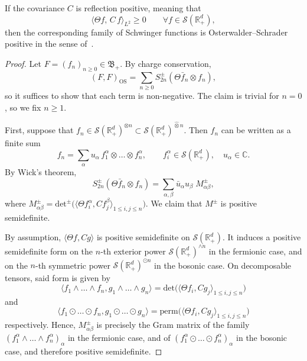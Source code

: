 \documentclass[10pt,a4paper,oneside,reqno]{amsart}
\newcommand{\reals}{\mathbb{R}}
\newcommand{\complexes}{\mathbb{C}}
\begin{document}
\begin{theorem}\label{thm:Reduction_to_2PF}
    If the covariance $C$ is reflection positive, meaning that
    \begin{equation}
        \langle \Theta f,\, C\, f \rangle_{L^2} \geq 0\qquad \forall f\in \mathcal{S}(\reals^{d}_+),
    \end{equation}
    then the corresponding family of Schwinger functions is
    Osterwalder--Schrader positive in the sense of~.
\end{theorem}
\begin{proof}
    Let $F=(f_n)_{n\ge 0}\in \mathfrak B_+$. By charge conservation,
    \begin{equation}
        (F,F)_{\mathrm{OS}} = \sum_{n\ge 0} S^\pm_{2n}(\Theta \bar f_n\otimes f_n),
    \end{equation}
    so it suffices to show that each term is non-negative. The claim is trivial for $n=0$, so we fix $n\ge 1$. 

    First, suppose that $f_n \in \mathcal S(\reals^d_+)^{\otimes n}\subset \mathcal S(\reals^d_+)^{\hat\otimes n}$. Then $f_n$ can be written as a finite sum 
    \begin{equation}
        f_n = \sum_\alpha u_\alpha\, f^\alpha_1\otimes\dots\otimes f^\alpha_n, \qquad f^\alpha_i\in \mathcal S(\reals^d_+), \quad u_\alpha\in \complexes.
    \end{equation}
    By Wick's theorem,
    \begin{equation}
        S^\pm_{2n}(\Theta \bar f_n\otimes f_n) = \sum_{\alpha ,\beta } \bar{u}_\alpha u_\beta\; M^{\pm}_{\alpha\beta},
    \end{equation}
    where $M^{\pm}_{\alpha\beta} = \mathrm{det}^\pm \big( \langle\Theta f^\alpha_i, C f^\beta_j\rangle_{1\leq i,j\leq n}\big)$. We claim that $M^\pm$ is positive semidefinite. 
    
    By assumption, $\langle\Theta f, C g\rangle$ is positive semidefinite on $\mathcal S(\reals^d_+)$. It induces a positive semidefinite form on the $n$-th exterior power $\mathcal{S}(\reals^d_+)^{\wedge n}$ in the fermionic case, and on the $n$-th symmetric power $\mathcal{S}(\reals^d_+)^{\odot n}$ in the bosonic case. On decomposable tensors, said form is given by
    \begin{equation}
        \langle f_1 \wedge\dots\wedge  f_n, g_1 \wedge\dots\wedge  g_n\rangle = \mathrm{det} \big( \langle\Theta f_i, C g_j\rangle_{1\leq i,j\leq n}\big)
    \end{equation} 
    and 
    \begin{equation}
        \langle f_1 \odot\dots\odot  f_n,  g_1 \odot\dots\odot  g_n\rangle = \mathrm{perm} \big( \langle\Theta f_i, C g_j\rangle_{1\leq i,j\leq n}\big)
    \end{equation} respectively. Hence, $M^{\pm}_{\alpha\beta}$ is precisely the Gram matrix of the family $({f}^\alpha_1 \wedge\dots\wedge {f}^\alpha_n)_\alpha$ in the fermionic case, and of $({f}^\alpha_1 \odot\dots\odot {f}^\alpha_n)_\alpha$ in the bosonic case, and therefore positive semidefinite.


\end{proof}
\end{document}
